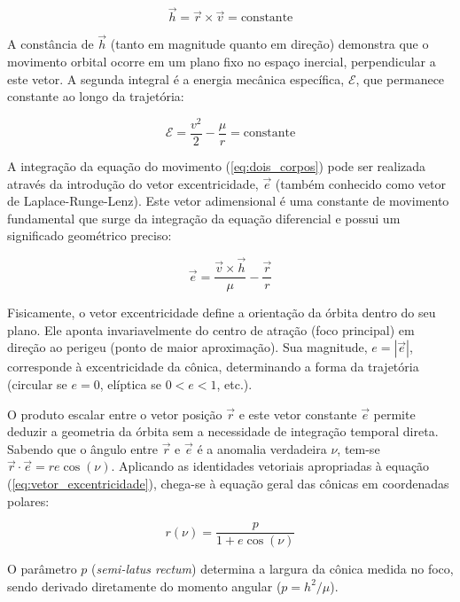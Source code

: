 \begin{equation}
    \vec{h} = \vec{r} \times \vec{v} = \text{constante}
    \label{eq:momento_angular}
\end{equation}

A constância de $\vec{h}$ (tanto em magnitude quanto em direção) demonstra que o movimento orbital ocorre em um plano fixo no espaço inercial, perpendicular a este vetor. A segunda integral é a energia mecânica específica, $\mathcal{E}$, que permanece constante ao longo da trajetória:

\begin{equation}
    \mathcal{E} = \frac{v^2}{2} - \frac{\mu}{r} = \text{constante}
    \label{eq:energia_especifica}
\end{equation}

A integração da equação do movimento (\ref{eq:dois_corpos}) pode ser realizada através da introdução do vetor excentricidade, $\vec{e}$ (também conhecido como vetor de Laplace-Runge-Lenz). Este vetor adimensional é uma constante de movimento fundamental que surge da integração da equação diferencial e possui um significado geométrico preciso:

\begin{equation}
    \vec{e} = \frac{\vec{v} \times \vec{h}}{\mu} - \frac{\vec{r}}{r}
    \label{eq:vetor_excentricidade}
\end{equation}

Fisicamente, o vetor excentricidade define a orientação da órbita dentro do seu plano. Ele aponta invariavelmente do centro de atração (foco principal) em direção ao perigeu (ponto de maior aproximação). Sua magnitude, $e = |\vec{e}|$, corresponde à excentricidade da cônica, determinando a forma da trajetória (circular se $e=0$, elíptica se $0 < e < 1$, etc.).

O produto escalar entre o vetor posição $\vec{r}$ e este vetor constante $\vec{e}$ permite deduzir a geometria da órbita sem a necessidade de integração temporal direta. Sabendo que o ângulo entre $\vec{r}$ e $\vec{e}$ é a anomalia verdadeira $\nu$, tem-se $\vec{r} \cdot \vec{e} = r e \cos(\nu)$. Aplicando as identidades vetoriais apropriadas à equação (\ref{eq:vetor_excentricidade}), chega-se à equação geral das cônicas em coordenadas polares:

\begin{equation}
    r(\nu) = \frac{p}{1 + e \cos(\nu)}
    \label{eq:conica_geral}
\end{equation}

O parâmetro $p$ (\textit{semi-latus rectum}) determina a largura da cônica medida no foco, sendo derivado diretamente do momento angular ($p = h^2/\mu$).

